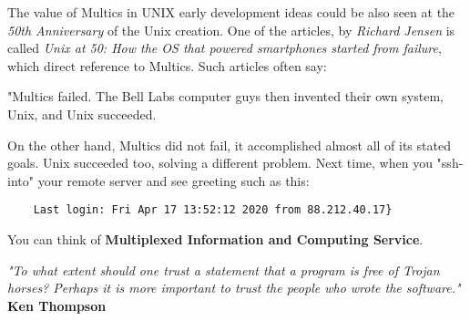 The value of Multics in UNIX early development ideas could be also seen at the \textit{50th Anniversary} of the Unix creation.
One of the articles, by \textit{Richard Jensen} is called \textit{Unix at 50: How the OS that powered smartphones started from 
failure}, which direct reference to Multics. Such articles often say: 
\begin{displayquote}
"Multics failed. The Bell Labs computer guys then invented their own system, Unix, and Unix succeeded.
\end{displayquote}
On the other hand, Multics did not fail, it accomplished almost all of its stated goals. Unix succeeded too, solving a different problem.
\newline \newline
Next time, when you "ssh-into" your remote server and see greeting such as this:
\begin{lstlisting}
    Last login: Fri Apr 17 13:52:12 2020 from 88.212.40.17}
\end{lstlisting}
You can think of \textbf{Multiplexed Information and Computing Service}.


\begin{displayquote}
\textit{
"To what extent should one trust a statement that a program is free of Trojan horses? 
Perhaps it is more important to trust the people who wrote the software."
}
\textbf{Ken Thompson} \cite{thompson}
\end{displayquote}

